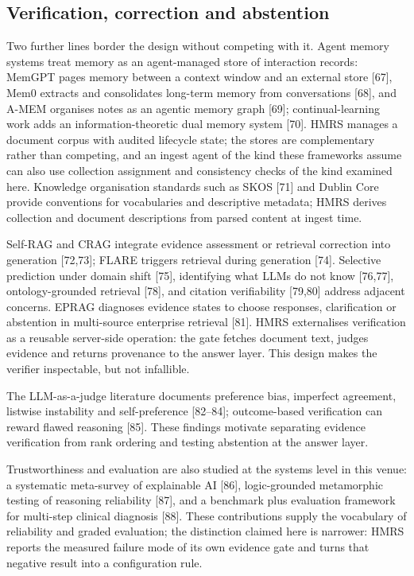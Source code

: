 \documentclass[11pt]{article}
\begin{document}
\subsection{Verification, correction and abstention}
Two further lines border the design without competing with it. Agent memory
systems treat memory as an agent-managed store of interaction records:
MemGPT pages memory between a context window and an external store
[67], Mem0 extracts and consolidates long-term memory from
conversations [68], and A-MEM organises notes as an agentic memory
graph [69]; continual-learning work adds an information-theoretic dual
memory system [70]. HMRS manages a document corpus with audited lifecycle
state; the stores are complementary rather than competing, and an ingest
agent of the kind these frameworks assume can also use collection assignment
and consistency checks of the kind examined here. Knowledge organisation
standards such as SKOS [71] and Dublin Core provide conventions for
vocabularies and descriptive metadata; HMRS derives collection and document
descriptions from parsed content at ingest time.

Self-RAG and CRAG integrate evidence assessment or retrieval correction into
generation [72,73]; FLARE triggers retrieval during generation
[74]. Selective prediction under domain shift [75],
identifying what LLMs do not know [76,77],
ontology-grounded retrieval [78], and citation verifiability
[79,80] address adjacent concerns. EPRAG
diagnoses evidence states to choose responses, clarification or abstention in
multi-source enterprise retrieval [81]. HMRS externalises
verification as a reusable server-side operation: the gate fetches document
text, judges evidence and returns provenance to the answer layer. This design
makes the verifier inspectable, but not infallible.

The LLM-as-a-judge literature documents preference bias, imperfect agreement,
listwise instability and self-preference [82--84]; outcome-based verification can reward flawed reasoning
[85]. These findings motivate separating evidence
verification from rank ordering and testing abstention at the answer layer.

Trustworthiness and evaluation are also studied at the systems level in this
venue: a systematic meta-survey of explainable AI [86],
logic-grounded metamorphic testing of reasoning reliability
[87], and a benchmark plus evaluation framework for multi-step
clinical diagnosis [88]. These contributions supply the
vocabulary of reliability and graded evaluation; the distinction claimed here
is narrower: HMRS reports the measured failure mode of its own evidence gate
and turns that negative result into a configuration rule.
\end{document}
